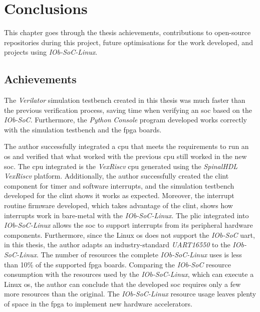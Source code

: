 \chapter{Conclusions}
\label{chapter:conclusions}
This chapter goes through the thesis achievements, contributions to open-source repositories during this project, future optimisations for the work developed, and projects using \textit{IOb-SoC-Linux}.

\section{Achievements}
\label{section:achievements}
The \textit{Verilator} simulation testbench created in this thesis was much faster than the previous verification process, saving time when verifying an \acrshort{soc} based on the \textit{IOb-SoC}. Furthermore, the \textit{Python} \textit{Console} program developed works correctly with the simulation testbench and the \acrshort{fpga} boards.

The author successfully integrated a \acrshort{cpu} that meets the requirements to run an \acrshort{os} and verified that what worked with the previous \acrshort{cpu} still worked in the new \acrshort{soc}. The \acrshort{cpu} integrated is the \textit{VexRiscv} \acrshort{cpu} generated using the \textit{SpinalHDL} \textit{VexRiscv} platform. Additionally, the author successfully created the \acrshort{clint} component for timer and software interrupts, and the simulation testbench developed for the \acrshort{clint} shows it works as expected. Moreover, the interrupt routine firmware developed, which takes advantage of the \acrshort{clint}, shows how interrupts work in bare-metal with the \textit{IOb-SoC-Linux}. The \acrshort{plic} integrated into \textit{IOb-SoC-Linux} allows the \acrshort{soc} to support interrupts from its peripheral hardware components. Furthermore, since the Linux \acrshort{os} does not support the \textit{IOb-SoC} \acrshort{uart}, in this thesis, the author adapts an industry-standard \textit{UART16550} to the \textit{IOb-SoC-Linux}. The number of resources the complete \textit{IOb-SoC-Linux} uses is less than 10\% of the supported \acrshort{fpga} boards. Comparing the \textit{IOb-SoC} resource consumption with the resources used by the \textit{IOb-SoC-Linux}, which can execute a Linux \acrshort{os}, the author can conclude that the developed \acrshort{soc} requires only a few more resources than the original. The \textit{IOb-SoC-Linux} resource usage leaves plenty of space in the \acrshort{fpga} to implement new hardware accelerators.

